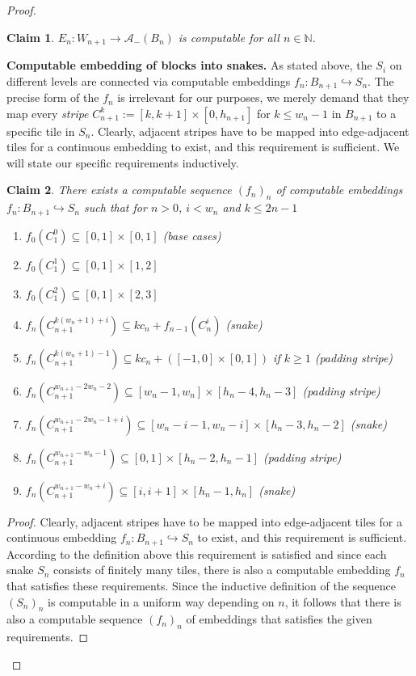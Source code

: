 \documentclass[a4paper]{amsart}
\def\IN{{\mathbb{N}}}
\def\into{\hookrightarrow}
\newtheorem{localclaim}{Claim}[theorem]
\theoremstyle{definition}
\begin{document}
\begin{proof}
\begin{localclaim}
\label{claim:En-computable}
$E_n: W_{n+1} \to \mathcal{A}_-(B_n)$ is computable for all $n\in\IN$.
\end{localclaim}

\noindent
{\bf Computable embedding of blocks into snakes.}
As stated above, the $S_i$ on different levels are connected via computable embeddings $f_n : B_{n+1} \hookrightarrow S_n$. The precise form of the $f_n$ is irrelevant for our purposes, we merely demand that they map every \emph{stripe} $C_{n+1}^k := [k,k+1] \times [0,h_{n+1}]$ for $k \leq w_n - 1$ in $B_{n+1}$ to a specific tile in $S_n$. Clearly, adjacent stripes have to be mapped into edge-adjacent tiles for a continuous embedding to exist, and this requirement is sufficient.
We will state our specific requirements inductively.

\begin{localclaim}
\label{claim:dim2-4}
There exists a computable sequence $(f_n)_n$ of computable embeddings $f_n:B_{n+1}\into S_n$ such that
for $n>0$, $i < w_n$ and $k \leq 2n-1$
\begin{enumerate}
\item $f_0(C^0_1) \subseteq [0,1] \times [0,1]$ \hfill (base cases)
\item $f_0(C^1_1) \subseteq [0,1] \times [1,2]$
\item $f_0(C^2_1) \subseteq [0,1] \times [2,3]$
\item $f_{n}(C_{n+1}^{k(w_n +1)+i}) \subseteq kc_{n} + f_{n-1}(C^i_n)$ \hfill (snake)
\item $f_n(C_{n+1}^{k(w_n +1)-1}) \subseteq kc_n +( [-1,0] \times [0,1])$ if $k\geq 1$ \hfill (padding stripe)
\item %
         $f_n(C_{n+1}^{w_{n+1}-2w_n-2}) \subseteq [w_n-1,w_n] \times [h_n - 4, h_n -3]$ \hfill (padding stripe)
\item %
        $f_n(C_{n+1}^{w_{n+1}-2w_n-1+i}) \subseteq [w_n-i-1,w_n-i] \times [h_n-3,h_n-2]$ \hfill (snake)
\item %
        $f_n(C_{n+1}^{w_{n+1}-w_n-1}) \subseteq [0,1] \times [h_n-2,h_n-1]$ \hfill (padding stripe)
\item %
        $f_n(C_{n+1}^{w_{n+1}-w_n+i}) \subseteq [i,i+1] \times [h_n-1, h_n]$ \hfill (snake) 
\end{enumerate}
\end{localclaim}
\begin{proof}
Clearly, adjacent stripes have to be mapped into edge-adjacent tiles for a continuous embedding $f_n:B_{n+1}\into S_n$ 
to exist, and this requirement is sufficient. According to the definition above this requirement is satisfied and since
each snake $S_n$ consists of finitely many tiles, there is also a computable embedding $f_n$ that satisfies these requirements.
Since the inductive definition of the sequence $(S_n)_n$ is computable in a uniform way depending on $n$, it follows
that there is also a computable sequence $(f_n)_n$ of embeddings that satisfies the given requirements.
\end{proof}


\end{proof}
\end{document}
